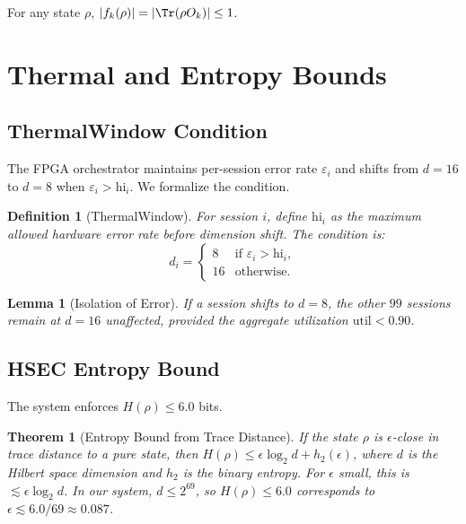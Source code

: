 \documentclass[11pt,a4paper]{article}
\newtheorem{theorem}{Theorem}
\newtheorem{lemma}{Lemma}
\newtheorem{definition}{Definition}
\theoremstyle{plain}
\begin{document}
\begin{corollary}
For any state $\rho$, $|f_k(\rho)| = |\Tr(\rho O_k)| \leq 1$.
\end{corollary}

\section{Thermal and Entropy Bounds}

\subsection{ThermalWindow Condition}

The FPGA orchestrator maintains per-session error rate $\varepsilon_i$ and shifts from $d=16$ to $d=8$ when $\varepsilon_i > \mathrm{hi}_i$. We formalize the condition.

\begin{definition}[ThermalWindow]
For session $i$, define $\mathrm{hi}_i$ as the maximum allowed hardware error rate before dimension shift. The condition is:
\[
d_i = \begin{cases}
8 & \text{if } \varepsilon_i > \mathrm{hi}_i,\\
16 & \text{otherwise}.
\end{cases}
\]
\end{definition}

\begin{lemma}[Isolation of Error]
If a session shifts to $d=8$, the other $99$ sessions remain at $d=16$ unaffected, provided the aggregate utilization $\mathrm{util} < 0.90$.
\end{lemma}

\subsection{HSEC Entropy Bound}

The system enforces $H(\rho) \leq 6.0$ bits.

\begin{theorem}[Entropy Bound from Trace Distance]
If the state $\rho$ is $\epsilon$-close in trace distance to a pure state, then $H(\rho) \leq \epsilon \log_2 d + h_2(\epsilon)$, where $d$ is the Hilbert space dimension and $h_2$ is the binary entropy. For $\epsilon$ small, this is $\lesssim \epsilon \log_2 d$. In our system, $d \leq 2^{69}$, so $H(\rho) \leq 6.0$ corresponds to $\epsilon \lesssim 6.0 / 69 \approx 0.087$.
\end{theorem}
\end{document}

